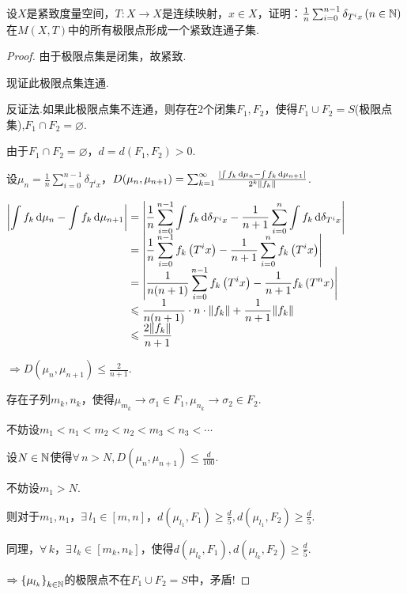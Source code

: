 \begin{example}
设$X$是紧致度量空间，$T:X\to X$是连续映射，$x\in X$，证明：$\frac{1}{n}\sum_{i=0}^{n-1}\delta_{T^i x}\,(n\in\mathbb{N})$在$M(X,T)$中的所有极限点形成一个紧致连通子集.
\end{example}
\begin{proof}
    由于极限点集是闭集，故紧致.\par
    现证此极限点集连通.\par
    反证法.如果此极限点集不连通，则存在2个闭集$F_1,F_2$，使得$F_1\cup F_2=S$(极限点集),$F_1\cap F_2=\varnothing$.\par
    由于$F_1\cap F_2=\varnothing$，$d=d(F_1,F_2)>0$.\par
    设$\mu_n=\frac{1}{n}\sum_{i=0}^{n-1}\delta_{T^i x}$，$D(\mu_n,\mu_{n+1})=\sum_{k=1}^{\infty}\frac{\left|\int{f_k}\mathop{}\!\mathrm{d}\mu_n-\int{f_k}\mathop{}\!\mathrm{d}\mu_{n+1}\right|}{2^k\|f_k\|}$.\par
    $\setjot[-2]\begin{aligned}[t]
        \left|\int{f_k}\d\mu_n-\int{f_k}\d\mu_{n+1}\right| &= \left|\frac{1}{n}\sum_{i=0}^{n-1}\int{f_k}\d\delta_{T^i x}-\frac{1}{n+1}\sum_{i=0}^{n}\int{f_k}\d\delta_{T^i x}\right| \\
        &=\left|\frac{1}{n}\sum_{i=0}^{n-1}f_k\left(T^ix\right)-\frac{1}{n+1}\sum_{i=0}^{n}f_k\left(T^ix\right)\right| \\
        &=\left|\frac{1}{n(n+1)}\sum_{i=0}^{n-1}f_k\left(T^ix\right)-\frac{1}{n+1}f_k\left(T^nx\right)\right| \\
        &\leq\frac{1}{n(n+1)}\cdot n\cdot\|f_k\|+\frac{1}{n+1}\|f_k\| \\
        &\leq \frac{2\|f_k\|}{n+1}
    \end{aligned}$\par
    $\Rightarrow D(\mu_n,\mu_{n+1})\leq \frac{2}{n+1}$.\par
    存在子列$m_k,n_k$，使得$\mu_{m_k}\to\sigma_1\in F_1,\mu_{n_k}\to\sigma_2\in F_2$.\par
    不妨设$m_1<n_1<m_2<n_2<m_3<n_3<\cdots$ \par
    设$N\in \mathbb{N}$使得$\forall\, n> N,D(\mu_n,\mu_{n+1})\leq \frac{d}{100}$.\par
    不妨设$m_1>N$.\par
    则对于$m_1,n_1$，$\exists\, l_1\in[m,n]$，$d(\mu_{l_1},F_1)\geq\frac{d}{5},d(\mu_{l_1},F_2)\geq\frac{d}{5}$.\par
    同理，$\forall\, k$，$\exists\, l_k\in[m_k,n_k]$，使得$d(\mu_{l_k},F_1),d(\mu_{l_k},F_2)\geq\frac{d}{5}$.\par
    $\Rightarrow \left\{\mu_{l_k}\right\}_{k\in\mathbb{N}}$的极限点不在$F_1\cup F_2=S$中，矛盾!
\end{proof}





